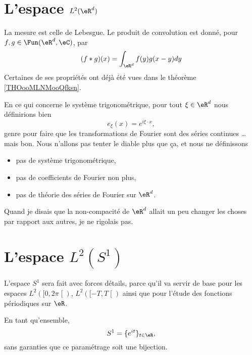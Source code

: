 \section{L'espace \( L^2(\eR^d)\)}

La mesure est celle de Lebesgue. Le produit de convolution est donné, pour \( f,g\in\Fun(\eR^d,\eC)\), par
\begin{equation}
    (f*g)(x)=\int_{\eR^d}f(y)g(x-y)dy
\end{equation}
Certaines de ses propriétés ont déjà été vues dans le théorème \ref{THOooMLNMooQfksn}.

En ce qui concerne le système trigonométrique, pour tout \( \xi\in \eR^d\) nous définirions bien
\begin{equation}
    e_{\xi}(x)= e^{i\xi\cdot x},
\end{equation}
genre pour faire que les transformations de Fourier sont des séries continues \ldots mais bon. Nous n'allons pas tenter le diable plus que ça, et nous ne définissons 
\begin{itemize}
    \item pas de système trigonométrique,
    \item pas de coefficients de Fourier non plus,
    \item pas de théorie des séries de Fourier sur \( \eR^d\).
\end{itemize}
Quand je disais que la non-compacité de \( \eR^d\) allait un peu changer les choses par rapport aux autres, je ne rigolais pas.

\section{L'espace \( L^2(S^1)\)}

L'espace \( S^1\) sera fait avec forces détails, parce qu'il va servir de base pour les espaces \( L^2(\mathopen[ 0 , 2\pi \mathclose[)\), \( L^2(\mathopen[ -T , T \mathclose[)\) ainsi que pour l'étude des fonctions périodiques sur \( \eR\).

En tant qu'ensemble,
\begin{equation}
    S^1=\{  e^{it} \}_{t\in \eR},
\end{equation}
sans garanties que ce paramétrage soit une bijection.

